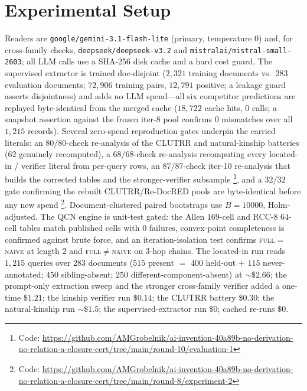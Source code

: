 \documentclass[11pt,letterpaper]{article}
\begin{document}
\section{Experimental Setup}
\label{sec:setup}

Readers are \texttt{google/gemini-3.1-flash-lite} (primary, temperature $0$) and, for cross-family checks, \texttt{deepseek/deepseek-v3.2} and \texttt{mistralai/mistral-small-2603}; all LLM calls use a SHA-256 disk cache and a hard cost guard. The supervised extractor is trained doc-disjoint ($2{,}321$ training documents vs.\ $283$ evaluation documents; $72{,}906$ training pairs, $12{,}791$ positive; a leakage guard asserts disjointness) and adds no LLM spend---all six competitor predictions are replayed byte-identical from the merged cache ($18{,}722$ cache hits, $0$ calls; a snapshot assertion against the frozen iter-8 pool confirms $0$ mismatches over all $1{,}215$ records). Several zero-spend reproduction gates underpin the carried literals: an $80/80$-check re-analysis of the CLUTRR and natural-kinship batteries ($62$ genuinely recomputed), a $68/68$-check re-analysis recomputing every located-in / verifier literal from per-query rows, an $87/87$-check iter-10 re-analysis that builds the corrected tables and the stronger-verifier subsample \footnote{Code: \url{https://github.com/AMGrobelnik/ai-invention-40a89b-no-derivation-no-relation-a-closure-cert/tree/main/round-10/evaluation-1}}, and a $32/32$ gate confirming the rebuilt CLUTRR/Re-DocRED pools are byte-identical before any new spend \footnote{Code: \url{https://github.com/AMGrobelnik/ai-invention-40a89b-no-derivation-no-relation-a-closure-cert/tree/main/round-8/experiment-2}}. Document-clustered paired bootstraps use $B{=}10000$, Holm-adjusted. The QCN engine is unit-test gated: the Allen $169$-cell and RCC-8 $64$-cell tables match published cells with $0$ failures, convex-point completeness is confirmed against brute force, and an iteration-isolation test confirms \textsc{full}$=$\textsc{naive} at length $2$ and \textsc{full}$\neq$\textsc{naive} on $3$-hop chains. The located-in run reads $1{,}215$ queries over $283$ documents ($515$ present $=$ $400$ held-out $+$ $115$ never-annotated; $450$ sibling-absent; $250$ different-component-absent) at ${\sim}\$2.66$; the prompt-only extraction sweep and the stronger cross-family verifier added a one-time $\$1.21$; the kinship verifier run $\$0.14$; the CLUTRR battery $\$0.30$; the natural-kinship run ${\sim}\$1.5$; the supervised-extractor run $\$0$; cached re-runs $\$0$.
\end{document}
